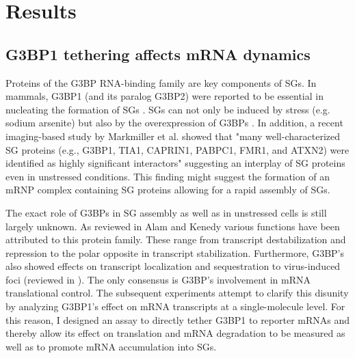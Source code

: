 \chapter{Results}


\section{G3BP1 tethering affects mRNA dynamics}

Proteins of the G3BP RNA-binding family are key components of SGs.
In mammals, G3BP1 (and its paralog G3BP2) were reported to be essential in nucleating the formation of SGs \cite{kedersha_g3bp-caprin1-usp10_2016}.
SGs can not only be induced by stress (e.g. sodium arsenite) but also by the overexpression of G3BPs \cite{tourriere_rasgap-associated_2003}.
In addition, a recent imaging-based study by Markmiller et al. \cite{markmiller_context-dependent_2018} showed that "many well-characterized SG proteins (e.g., G3BP1, TIA1, CAPRIN1, PABPC1, FMR1, and ATXN2) were identified as highly significant interactors" suggesting an interplay of SG proteins even in unstressed conditions.
This finding might suggest the formation of an mRNP complex containing SG proteins allowing for a rapid assembly of SGs.

The exact role of G3BPs in SG assembly as well as in unstressed cells is still largely unknown.
As reviewed in Alam and Kenedy \cite{alam_rasputin_2019} various functions have been attributed to this protein family.
These range from transcript destabilization and repression to the polar opposite in transcript stabilization.
Furthermore, G3BP's also showed effects on transcript localization and sequestration to virus-induced foci (reviewed in \cite{zhang_chronic_2019}).
The only consensus is G3BP's involvement in mRNA translational control.
The subsequent experiments attempt to clarify this disunity by analyzing G3BP1's effect on mRNA transcripts at a single-molecule level.
For this reason, I designed an assay to directly tether G3BP1 to reporter mRNAs and thereby allow its effect on translation and mRNA degradation to be measured as well as to promote mRNA accumulation into SGs.

